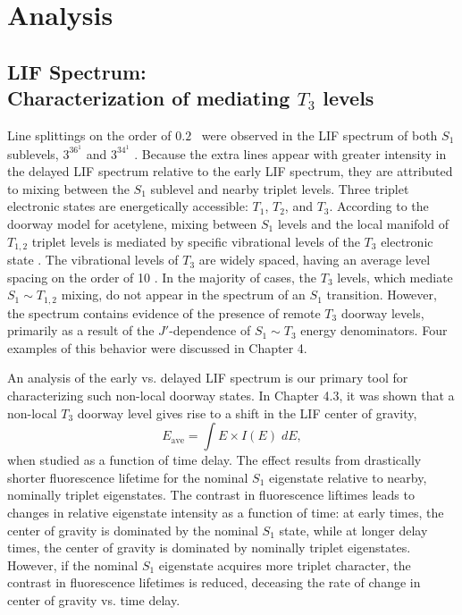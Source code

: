 \documentclass[12pt]{mitthesis}
\begin{document}
\section{Analysis}

\subsection{LIF Spectrum: \\Characterization of mediating $T_3$
  levels}

Line splittings on the order of $0.2$ \rcm\ were observed in the LIF
spectrum of both $S_1$ sublevels, $3^36^1$  and $3^34^1$ .
Because the extra lines appear with greater intensity in the delayed
LIF spectrum relative to the early LIF spectrum, they are attributed
to mixing between the $S_1$ sublevel and nearby triplet levels.  Three
triplet electronic states are energetically accessible: $T_1$, $T_2$,
and $T_3$.  According to the doorway model for acetylene, mixing
between $S_1$ levels and the local manifold of $T_{1,2}$ triplet
levels is mediated by specific vibrational levels of the $T_3$
electronic state .  The vibrational levels of $T_3$ are
widely spaced, having an average level spacing on the order of 10 \rcm
\cite{thom07}.  In the majority of cases, the $T_3$ levels, which
mediate $S_1 \sim T_{1,2}$ mixing, do not appear in the spectrum of an
$S_1$ transition.  However, the spectrum contains evidence of the
presence of remote $T_3$ doorway levels, primarily as a result of the
$J'$-dependence of $S_1 \sim T_3$ energy denominators.  Four examples
of this behavior were discussed in Chapter 4. 

An analysis of the early vs. delayed LIF spectrum is our primary tool
for characterizing such non-local doorway states.  In Chapter 4.3, it was
shown that a non-local $T_3$ doorway level gives rise to a shift in
the LIF center of gravity,
\begin{equation}
  E_{\text{ave}} = \int E \times I(E) \; dE,
\end{equation}
when studied as a function of time delay.  The effect results from
drastically shorter fluorescence lifetime for the nominal $S_1$
eigenstate relative to nearby, nominally triplet eigenstates.  The
contrast in fluorescence liftimes leads to changes in relative
eigenstate intensity as a function of time: at early times, the center
of gravity is dominated by the nominal $S_1$ state, while at longer
delay times, the center of gravity is dominated by nominally triplet
eigenstates.  However, if the nominal $S_1$ eigenstate acquires more
triplet character, the contrast in fluorescence lifetimes is reduced,
deceasing the rate of change in center of gravity vs. time delay.
\end{document}
